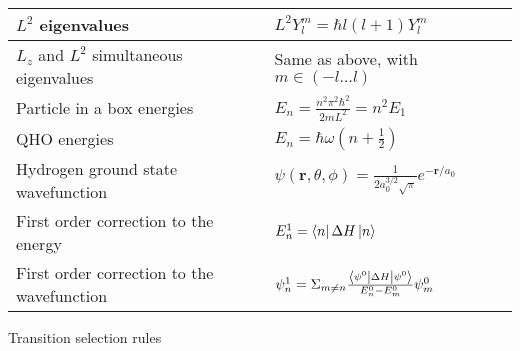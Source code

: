\documentclass[11pt]{paper}
\begin{document}
\begin{longtable}{ll}
\multicolumn{1}{|l|}{$L^2$ eigenvalues} & \multicolumn{1}{l|}{$L^2 Y_l^m = \hbar l(l+1) Y_l^m$} \\ \hline
\multicolumn{1}{|l|}{$L_z$ and $L^2$ simultaneous eigenvalues} & \multicolumn{1}{l|}{Same as above, with $m\in \left(-l\dots l\right)$} \\ \hline
\multicolumn{1}{|l|}{Particle in a box energies} & \multicolumn{1}{l|}{$E_n = \frac{n^2 \pi^2 \hbar^2}{2mL^2} = n^2 E_1$} \\ \hline
\multicolumn{1}{|l|}{QHO energies} & \multicolumn{1}{l|}{$E_n = \hbar \omega \left(n + \frac{1}{2}\right)$} \\ \hline
\multicolumn{1}{|l|}{Hydrogen ground state wavefunction} & \multicolumn{1}{l|}{$\psi\left(\mathbf{r},\theta,\phi\right) = \frac{1}{2a_0^{3/2}\sqrt{\pi}}e^{-\mathbf{r}/a_0}$} \\ \hline
\multicolumn{1}{|l|}{First order correction to the energy} & \multicolumn{1}{l|}{$E_n^1 = \bra{n}\Delta H\ket{n}$} \\ \hline
\multicolumn{1}{|l|}{First order correction to the wavefunction} & \multicolumn{1}{l|}{$\psi_n^1 = \Sigma_{m\neq n}\frac{\bra{\psi^0}\Delta H \ket{\psi^0}}{E_n^0 - E_m^0}\psi_m^0$} \\ \hline

\end{longtable}
\begin{center}
Transition selection rules\\[4pt]
\\[50pt]
\end{center}

\newpage
\end{document}
